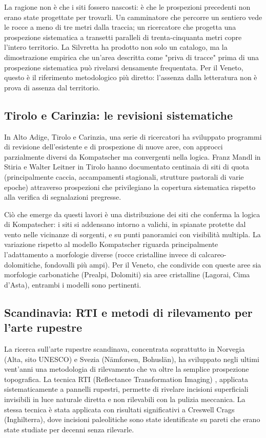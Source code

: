 La ragione non è che i siti fossero nascosti: è che le prospezioni precedenti non erano state progettate per trovarli. Un camminatore che percorre un sentiero vede le rocce a meno di tre metri dalla traccia; un ricercatore che progetta una prospezione sistematica a transetti paralleli di trenta-cinquanta metri copre l'intero territorio. La Silvretta ha prodotto non solo un catalogo, ma la dimostrazione empirica che un'area descritta come "priva di tracce" prima di una prospezione sistematica può rivelarsi densamente frequentata. Per il Veneto, questo è il riferimento metodologico più diretto: l'assenza dalla letteratura non è prova di assenza dal territorio.

\subsection*{Tirolo e Carinzia: le revisioni sistematiche}

In Alto Adige, Tirolo e Carinzia, una serie di ricercatori ha sviluppato programmi di revisione dell'esistente e di prospezione di nuove aree, con approcci parzialmente diversi da Kompatscher ma convergenti nella logica. Franz Mandl in Stiria \citep{mandl2002} e Walter Leitner in Tirolo \citep{leitner2013} hanno documentato centinaia di siti di quota (principalmente caccia, accampamenti stagionali, strutture pastorali di varie epoche) attraverso prospezioni che privilegiano la copertura sistematica rispetto alla verifica di segnalazioni pregresse.

Ciò che emerge da questi lavori è una distribuzione dei siti che conferma la logica di Kompatscher: i siti si addensano intorno a valichi, in spianate protette dal vento nelle vicinanze di sorgenti, e su punti panoramici con visibilità multipla. La variazione rispetto al modello Kompatscher riguarda principalmente l'adattamento a morfologie diverse (rocce cristalline invece di calcareo-dolomitiche, fondovalli più ampi). Per il Veneto, che condivide con queste aree sia morfologie carbonatiche (Prealpi, Dolomiti) sia aree cristalline (Lagorai, Cima d'Asta), entrambi i modelli sono pertinenti.

\subsection*{Scandinavia: RTI e metodi di rilevamento per l'arte rupestre}

La ricerca sull'arte rupestre scandinava, concentrata soprattutto in Norvegia (Alta, sito UNESCO) e Svezia (Nämforsen, Bohuslän), ha sviluppato negli ultimi vent'anni una metodologia di rilevamento che va oltre la semplice prospezione topografica. La tecnica RTI (Reflectance Transformation Imaging) \citep{earl2010}, applicata sistematicamente a pannelli rupestri, permette di rivelare incisioni superficiali invisibili in luce naturale diretta e non rilevabili con la pulizia meccanica. La stessa tecnica è stata applicata con risultati significativi a Creswell Crags (Inghilterra), dove incisioni paleolitiche sono state identificate su pareti che erano state studiate per decenni senza rilevarle.

